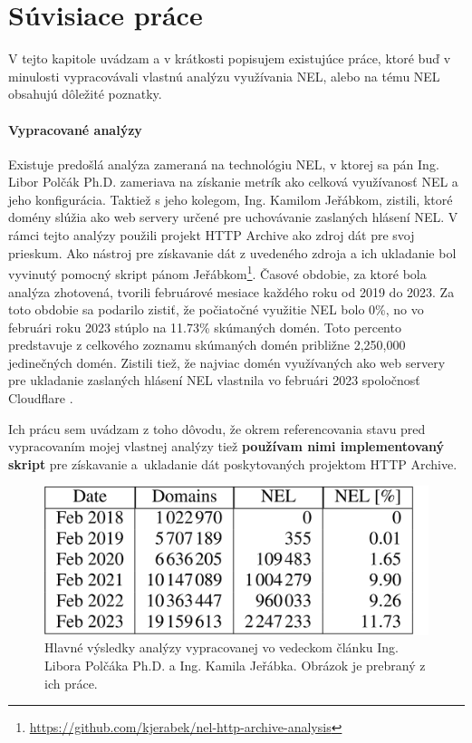 \chapter{Súvisiace práce}
\label{related-work}

V tejto kapitole uvádzam a v krátkosti popisujem existujúce práce, ktoré buď v minulosti vypracovávali vlastnú analýzu využívania NEL, alebo na tému NEL obsahujú dôležité poznatky.

\subsubsection{Vypracované analýzy}
\label{praca-veduceho}
\label{skript}

Existuje predošlá analýza zameraná na technológiu NEL, v ktorej sa pán Ing. Libor Polčák Ph.D. zameriava na získanie metrík ako celková využívanosť NEL a jeho konfigurácia.
Taktiež s jeho kolegom, Ing. Kamilom Jeřábkom, zistili, ktoré domény slúžia ako web servery určené pre uchovávanie zaslaných hlásení NEL.
V rámci tejto analýzy použili projekt HTTP Archive ako zdroj dát pre svoj prieskum.
Ako nástroj pre získavanie dát z uvedeného zdroja a ich ukladanie bol vyvinutý pomocný skript 
pánom Jeřábkom\footnote{\href{https://github.com/kjerabek/nel-http-archive-analysis}{https://github.com/kjerabek/nel-http-archive-analysis}}.
Časové obdobie, za ktoré bola analýza zhotovená, tvorili februárové mesiace každého roku od 2019 do 2023. 
Za toto obdobie sa podarilo zistiť, že počiatočné využitie NEL bolo 0\%, no vo februári roku 2023 stúplo na 11.73\% skúmaných domén.
Toto percento predstavuje z celkového zoznamu skúmaných domén približne 2,250,000 jedinečných domén.
Zistili tiež, že najviac domén využívaných ako web servery pre ukladanie zaslaných hlásení NEL vlastnila vo februári 2023 spoločnosť Cloudflare \cite{nel-http-archive}.

Ich prácu sem uvádzam z toho dôvodu, že okrem referencovania stavu pred vypracovaním mojej vlastnej analýzy tiež \textbf{používam nimi implementovaný skript} pre získavanie \mbox{a ukladanie} dát poskytovaných projektom HTTP Archive.

\begin{figure}[!htb]
\begin{center}
    \includegraphics[width=0.5\linewidth]{obrazky-figures/polcak-analysis.png}
    \caption{\centering Hlavné výsledky analýzy vypracovanej vo vedeckom článku Ing. Libora Polčáka Ph.D. a Ing. Kamila Jeřábka. Obrázok je prebraný z ich práce.}
    \label{fig:polcak-analysis}
\end{center}
\end{figure}

